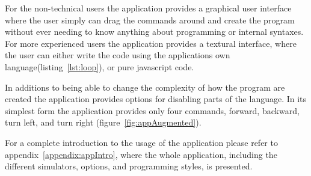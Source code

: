 \bigskip\noindent
For the non-technical users the application provides a graphical user interface where the user simply can drag the commands around and create the program without ever needing to know anything about programming or internal syntaxes. For more experienced users the application provides a textural interface, where the user can either write the code using the applications own language(listing~\ref{lst:loop}), or pure javascript code. 

\bigskip\noindent
In additions to being able to change the complexity of how the program are created the application provides options for disabling parts of the language. In its simplest form the application provides only four commands, forward, backward, turn left, and turn right (figure~\ref{fig:appAugmented}). 


\bigskip\noindent
For a complete introduction to the usage of the application please refer to appendix~\ref{appendix:appIntro}, where the whole application, including the different simulators, options, and programming styles, is presented.